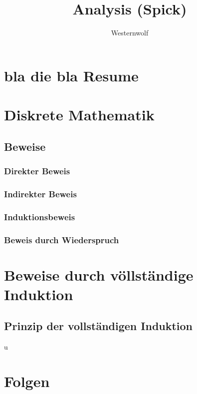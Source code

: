 \documentclass[a4paper,10pt]{scrartcl}
\title{Analysis (Spick)}
\author{Westernwolf}
\begin{document}
\maketitle
\newpage

\tableofcontents
\newpage

\section{bla die bla Resume}
\section{Diskrete Mathematik}%
	
	\subsection{Beweise}
		\subsubsection{Direkter Beweis}
		
		\subsubsection{Indirekter Beweis}
		
		\subsubsection{Induktionsbeweis}
		
		\subsubsection{Beweis durch Wiederspruch}

\section{Beweise durch völlständige Induktion}
	
	\subsection{Prinzip der vollständigen Induktion}u
	
\section{Folgen}
	
\end{document}
